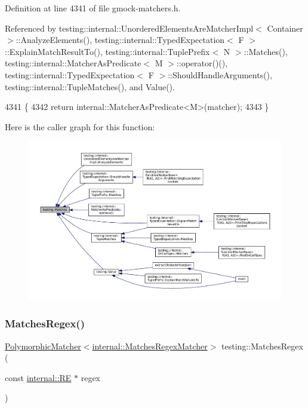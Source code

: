 Definition at line 4341 of file gmock-\/matchers.\+h.



Referenced by testing\+::internal\+::\+Unordered\+Elements\+Are\+Matcher\+Impl$<$ Container $>$\+::\+Analyze\+Elements(), testing\+::internal\+::\+Typed\+Expectation$<$ F $>$\+::\+Explain\+Match\+Result\+To(), testing\+::internal\+::\+Tuple\+Prefix$<$ N $>$\+::\+Matches(), testing\+::internal\+::\+Matcher\+As\+Predicate$<$ M $>$\+::operator()(), testing\+::internal\+::\+Typed\+Expectation$<$ F $>$\+::\+Should\+Handle\+Arguments(), testing\+::internal\+::\+Tuple\+Matches(), and Value().


\begin{DoxyCode}
4341                                                         \{
4342   \textcolor{keywordflow}{return} internal::MatcherAsPredicate<M>(matcher);
4343 \}
\end{DoxyCode}
Here is the caller graph for this function\+:
\nopagebreak
\begin{figure}[H]
\begin{center}
\leavevmode
\includegraphics[width=350pt]{namespacetesting_ad53b509ae9cd51040d67f668f99702ae_icgraph}
\end{center}
\end{figure}
\mbox{\label{namespacetesting_a4dac232f315edc259b62ce88e413b107}} 
\subsubsection{\texorpdfstring{Matches\+Regex()}{MatchesRegex()}\hspace{0.1cm}{\footnotesize\ttfamily [1/2]}}
{\footnotesize\ttfamily \hyperlink{classtesting_1_1PolymorphicMatcher}{Polymorphic\+Matcher}$<$\hyperlink{classtesting_1_1internal_1_1MatchesRegexMatcher}{internal\+::\+Matches\+Regex\+Matcher}$>$ testing\+::\+Matches\+Regex (\begin{DoxyParamCaption}\item[{const \hyperlink{classtesting_1_1internal_1_1RE}{internal\+::\+RE} $\ast$}]{regex }\end{DoxyParamCaption})\hspace{0.3cm}{\ttfamily [inline]}}



